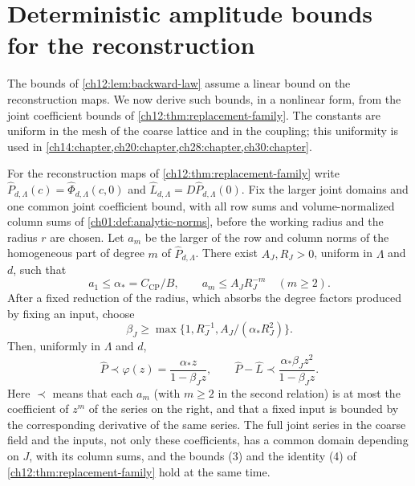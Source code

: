 \section{Deterministic amplitude bounds for the reconstruction}\label{ch12:sec:amplitude}

The bounds of \cref{ch12:lem:backward-law} assume a linear bound on the reconstruction maps. We now derive such bounds, in a nonlinear form, from the joint coefficient bounds of \cref{ch12:thm:replacement-family}. The constants are uniform in the mesh of the coarse lattice and in the coupling; this uniformity is used in \cref{ch14:chapter,ch20:chapter,ch28:chapter,ch30:chapter}.

\begin{lemma}\label{ch12:lem:deterministic-prolongation-reserve}
For the reconstruction maps of \cref{ch12:thm:replacement-family} write $\widehat P_{d,\Lambda}(c)=\widehat\Phi_{d,\Lambda}(c,0)$ and $\widehat L_{d,\Lambda}=D\widehat P_{d,\Lambda}(0)$. Fix the larger joint domains and one common joint coefficient bound, with all row sums and volume-normalized column sums of \cref{ch01:def:analytic-norms}, before the working radius and the radius $r$ are chosen. Let $a_m$ be the larger of the row and column norms of the homogeneous part of degree $m$ of $\widehat P_{d,\Lambda}$. There exist $A_J,R_J>0$, uniform in $\Lambda$ and $d$, such that
\[
 a_1\le\alpha_*=C_{\mathrm{CP}}/B,\qquad a_m\le A_JR_J^{-m}\quad(m\ge2).
\]
After a fixed reduction of the radius, which absorbs the degree factors produced by fixing an input, choose
\[
 \beta_J\ge\max\{1,R_J^{-1},A_J/(\alpha_*R_J^2)\}.
\]
Then, uniformly in $\Lambda$ and $d$,
\[
 \widehat P\prec\varphi(z)=\frac{\alpha_*z}{1-\beta_Jz},\qquad
 \widehat P-\widehat L\prec\frac{\alpha_*\beta_Jz^2}{1-\beta_Jz}.
\]
Here $\prec$ means that each $a_m$ (with $m\ge2$ in the second relation) is at most the coefficient of $z^m$ of the series on the right, and that a fixed input is bounded by the corresponding derivative of the same series. The full joint series in the coarse field and the inputs, not only these coefficients, has a common domain depending on $J$, with its column sums, and the bounds (3) and the identity (4) of \cref{ch12:thm:replacement-family} hold at the same time.


\end{lemma}
